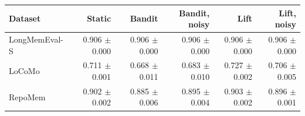 \begin{tabular}{@{}lrrrrr@{}}\toprule
Dataset & Static & Bandit & Bandit, noisy & Lift & Lift, noisy \\\midrule
LongMemEval-S & 0.906 $\pm$ 0.000 & 0.906 $\pm$ 0.000 & 0.906 $\pm$ 0.000 & 0.906 $\pm$ 0.000 & 0.906 $\pm$ 0.000 \\
LoCoMo & 0.711 $\pm$ 0.001 & 0.668 $\pm$ 0.011 & 0.683 $\pm$ 0.010 & 0.727 $\pm$ 0.002 & 0.706 $\pm$ 0.005 \\
RepoMem & 0.902 $\pm$ 0.002 & 0.885 $\pm$ 0.006 & 0.895 $\pm$ 0.004 & 0.903 $\pm$ 0.002 & 0.896 $\pm$ 0.001 \\
\bottomrule\end{tabular}